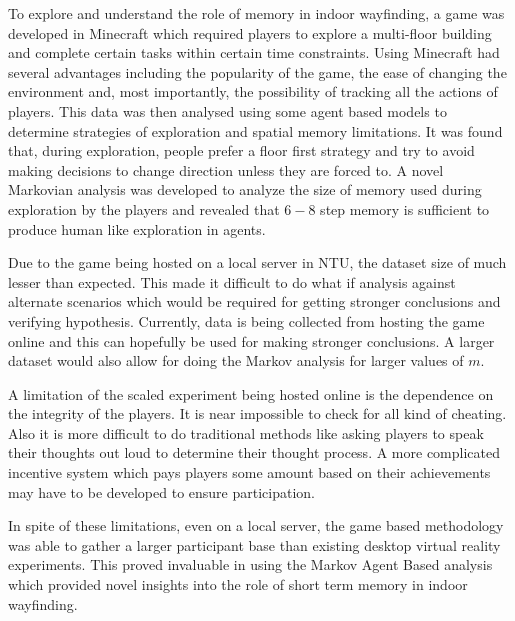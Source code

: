 To explore and understand the role of memory in indoor wayfinding, a game was developed in Minecraft which required players to explore a multi-floor building and complete certain tasks within certain time constraints. Using Minecraft had several advantages including the popularity of the game, the ease of changing the environment and, most importantly, the possibility of tracking all the actions of players. This data was then analysed using some agent based models to determine strategies of exploration and spatial memory limitations. It was found that, during exploration, people prefer a floor first strategy and try to avoid making decisions to change direction unless they are forced to. A novel Markovian analysis was developed to analyze the size of memory used during exploration by the players and revealed that $6-8$ step memory is sufficient to produce human like exploration in agents.




Due to the game being hosted on a local server in NTU, the dataset size of much lesser than expected. This made it difficult to do what if analysis against alternate scenarios which would be required for getting stronger conclusions and verifying hypothesis. Currently, data is being collected from hosting the game online and this can hopefully be used for making stronger conclusions. A larger dataset would also allow for doing the Markov analysis for larger values of $m$.

A limitation of the scaled experiment being hosted online is the dependence on the integrity of the players. It is near impossible to check for all kind of cheating. Also it is more difficult to do traditional methods like asking players to speak their thoughts out loud to determine their thought process. A more complicated incentive system which pays players some amount based on their achievements may have to be developed to ensure participation.

In spite of these limitations, even on a local server, the game based methodology was able to gather a larger participant base than existing desktop virtual reality experiments. This proved invaluable in using the Markov Agent Based analysis which provided novel insights into the role of short term memory in indoor wayfinding.


